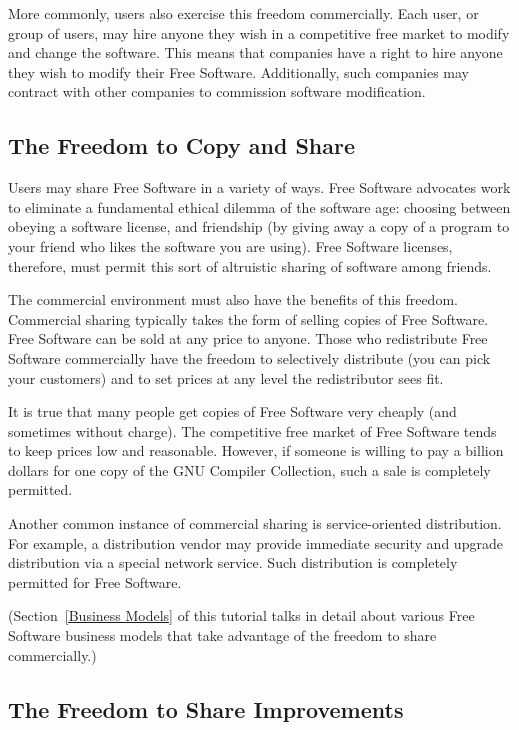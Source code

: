More commonly, users also exercise this freedom commercially.  Each user, or
group of users, may hire anyone they wish in a competitive free market to
modify and change the software.  This means that companies have a right to
hire anyone they wish to modify their Free Software.  Additionally, such
companies may contract with other companies to commission software
modification.

\subsection{The Freedom to Copy and Share}

Users may share Free Software in a variety of ways. Free Software
advocates work to eliminate a fundamental ethical dilemma of the software
age: choosing between obeying a software license, and friendship (by
giving away a copy of a program to your friend who likes the software you are
using). Free Software licenses, therefore, must permit this sort of
altruistic sharing of software among friends.

The commercial environment must also have the benefits of this freedom.
Commercial sharing typically takes the form of selling copies of Free
Software. Free Software can be sold at any price to anyone. Those who
redistribute Free Software commercially have the freedom to selectively
distribute (you can pick your customers) and to set prices at any level
the redistributor sees fit.

It is true that many people get copies of Free Software very cheaply (and
sometimes without charge). The competitive free market of Free Software
tends to keep prices low and reasonable. However, if someone is willing
to pay a billion dollars for one copy of the GNU Compiler Collection, such
a sale is completely permitted.

Another common instance of commercial sharing is service-oriented
distribution. For example, a distribution vendor may provide immediate
security and upgrade distribution via a special network service. Such
distribution is completely permitted for Free Software.

(Section~\ref{Business Models} of this tutorial talks in detail about
various Free Software business models that take advantage of the freedom
to share commercially.)

\subsection{The Freedom to Share Improvements}

